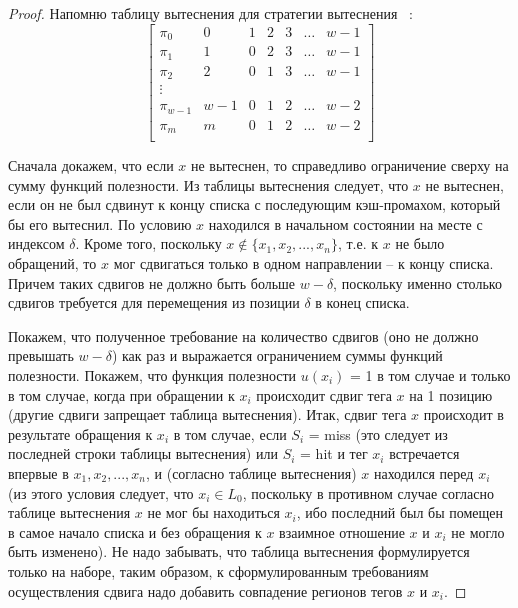 \begin{proof}
  Напомню таблицу вытеснения для стратегии вытеснения \LRU~\cite{policy_tables}:
  $$
  \left[
    \begin{array}{c|cccccc}
      \pi_0 & 0 & 1 & 2 & 3 & \dots & w{-}1 \\
      \pi_1 & 1 & 0 & 2 & 3 & \dots & w{-}1 \\
      \pi_2 & 2 & 0 & 1 & 3 & \dots & w{-}1 \\
      \vdots &  &  &  & & & \\
      \pi_{w-1} & w{-}1 & 0 & 1 & 2 & \dots & w{-}2 \\
      \pi_m & m & 0 & 1 & 2 & \dots & w{-}2 \\
    \end{array}
  \right]
  $$

  Сначала докажем, что если $x$ не вытеснен, то справедливо ограничение сверху
  на сумму функций полезности. Из таблицы вытеснения следует, что
  $x$ не вытеснен, если он не был сдвинут к концу списка с
  последующим кэш-промахом, который бы его вытеснил. По условию $x$
  находился в начальном состоянии на месте с индексом $\delta$.
  Кроме того, поскольку $x \notin \{x_1, x_2, ..., x_n\}$, т.е. к
  $x$ не было обращений, то $x$ мог сдвигаться только в одном
  направлении -- к концу списка. Причем таких сдвигов не должно быть
  больше $w-\delta$, поскольку именно столько сдвигов требуется для
  перемещения из позиции $\delta$ в конец списка.

  Покажем, что полученное требование на количество сдвигов (оно не
  должно превышать $w-\delta$) как раз и выражается ограничением
  суммы функций полезности. Покажем, что функция полезности $u(x_i)$
  = 1 в том случае и только в том случае, когда при обращении к
  $x_i$ происходит сдвиг тега $x$ на 1 позицию (другие сдвиги
  запрещает таблица вытеснения). Итак, сдвиг тега $x$
  происходит в результате обращения к $x_i$ в том случае, если $S_i$ = miss
  (это следует из последней строки таблицы вытеснения) или $S_i$ = hit
  и тег $x_i$ встречается впервые в $x_1, x_2, ..., x_n$, и (согласно таблице
  вытеснения) $x$ находился перед $x_i$ (из этого условия следует, что $x_i \in L_0$,
  поскольку в противном случае согласно таблице вытеснения $x$ не
  мог бы находиться $x_i$, ибо последний был бы помещен в самое начало списка и
  без обращения к $x$ взаимное отношение $x$ и $x_i$ не могло быть изменено). Не надо забывать, что
  таблица вытеснения формулируется только на наборе, таким образом,
  к сформулированным требованиям осуществления сдвига надо добавить
  совпадение регионов тегов $x$ и $x_i$.


\end{proof}
